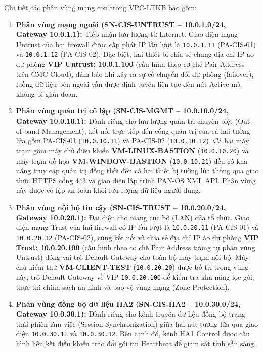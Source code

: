 \documentclass[12pt,a4paper]{article}
\begin{document}
\vspace{0.3cm}

\noindent Chi tiết các phân vùng mạng con trong VPC-LTKB bao gồm:
\begin{enumerate}
    \item \textbf{Phân vùng mạng ngoài (SN-CIS-UNTRUST -- 10.0.1.0/24, Gateway 10.0.1.1):} Tiếp nhận lưu lượng từ Internet. Giao diện mạng Untrust của hai firewall được cấp phát IP lần lượt là \texttt{10.0.1.11} (PA-CIS-01) và \texttt{10.0.1.12} (PA-CIS-02). Đặc biệt, hai thiết bị chia sẻ chung địa chỉ IP ảo dự phòng \textbf{VIP Untrust: 10.0.1.100} (cấu hình theo cơ chế Pair Address trên CMC Cloud), đảm bảo khi xảy ra sự cố chuyển đổi dự phòng (failover), luồng dữ liệu bên ngoài vẫn được định tuyến liên tục đến nút Active mà không bị gián đoạn.
    \item \textbf{Phân vùng quản trị cô lập (SN-CIS-MGMT -- 10.0.10.0/24, Gateway 10.0.10.1):} Dành riêng cho lưu lượng quản trị chuyên biệt (Out-of-band Management), kết nối trực tiếp đến cổng quản trị của cả hai tường lửa gồm PA-CIS-01 (\texttt{10.0.10.11}) và PA-CIS-02 (\texttt{10.0.10.12}). Cả hai máy trạm gồm máy chủ điều khiển \textbf{VM-LINUX-BASTION} (\texttt{10.0.10.20}) và máy trạm đồ họa \textbf{VM-WINDOW-BASTION} (\texttt{10.0.10.21}) đều có khả năng truy cập quản trị đồng thời đến cả hai thiết bị tường lửa thông qua giao thức HTTPS cổng 443 và giao diện lập trình PAN-OS XML API. Phân vùng này được cô lập an toàn khỏi lưu lượng dữ liệu người dùng.
    \item \textbf{Phân vùng nội bộ tin cậy (SN-CIS-TRUST -- 10.0.20.0/24, Gateway 10.0.20.1):} Đại diện cho mạng cục bộ (LAN) của tổ chức. Giao diện mạng Trust của hai firewall có IP lần lượt là \texttt{10.0.20.11} (PA-CIS-01) và \texttt{10.0.20.12} (PA-CIS-02), cùng kết nối và chia sẻ địa chỉ IP ảo dự phòng \textbf{VIP Trust: 10.0.20.100} (cấu hình theo cơ chế Pair Address tương tự phân vùng Untrust) đóng vai trò Default Gateway cho toàn bộ máy trạm nội bộ. Máy chủ kiểm thử \textbf{VM-CLIENT-TEST} (\texttt{10.0.20.20}) được bố trí trong vùng này, trỏ Default Gateway về VIP \texttt{10.0.20.100} để kiểm tra khả năng lọc gói, thực thi chính sách an ninh và bảo vệ vùng mạng (Zone Protection).
    \item \textbf{Phân vùng đồng bộ dữ liệu HA2 (SN-CIS-HA2 -- 10.0.30.0/24, Gateway 10.0.30.1):} Dành riêng cho kênh truyền dữ liệu đồng bộ trạng thái phiên làm việc (Session Synchronization) giữa hai nút tường lửa qua giao diện \texttt{10.0.30.11} và \texttt{10.0.30.12}. Bên cạnh đó, kênh HA1 Control được cấu hình liên kết điều khiển trao đổi gói tin Heartbeat để giám sát tính sẵn sàng.
\end{enumerate}
\end{document}
